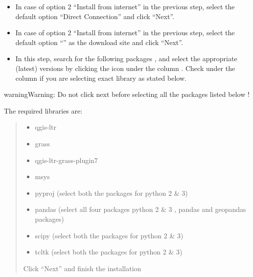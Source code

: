 \documentclass[letterpaper,10pt,english]{sphinxmanual}
\let\sphinxpxdimen\pdfpxdimen\else\newdimen\sphinxpxdimen
\begin{document}
\begin{figure}[htbp]
\centering

\noindent\sphinxincludegraphics[width=400\sphinxpxdimen]{{osgeo4}.png}
\end{figure}
\begin{itemize}
\item {} 
In case of option 2 “Install from internet” in the previous step, select the default option “Direct Connection” and click “Next”.

\item {} 
In case of option 2 “Install from internet” in the previous step, select the default option “” as the download site and click “Next”.

\end{itemize}
\begin{itemize}
\item {} 
In this step, search for the following packages , and select the appropriate (latest) versions by clicking the  icon under the column . Check under the  column if you are selecting exact library as stated below.

\end{itemize}

\begin{sphinxadmonition}{warning}{Warning:}
Do not click next before selecting all the packages listed below !
\end{sphinxadmonition}

\begin{DUlineblock}{0em}
\item[] The required libraries are:
\end{DUlineblock}
\begin{quote}
\begin{itemize}
\item {} 
qgis-ltr

\item {} 
grass

\item {} 
qgis-ltr-grass-plugin7

\item {} 
msys

\item {} 
pyproj (select both the packages for python 2 \& 3)

\item {} 
pandas (select all four packages python 2 \& 3 , pandas and geopandas packages)

\item {} 
scipy (select both the packages for python 2 \& 3)

\item {} 
tcltk (select both the packages for python 2 \& 3)

\end{itemize}

\begin{DUlineblock}{0em}
\item[] Click “Next” and finish the installation
\end{DUlineblock}
\end{quote}
\end{document}
